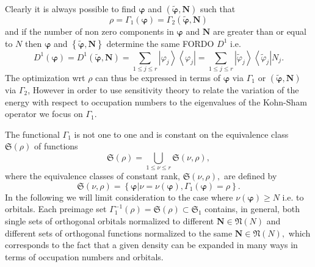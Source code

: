 \documentclass[aps,preprint]{revtex4}%
\begin{document}
\begin{itemize}
Clearly it is always possible to find $\boldsymbol{\varphi}$ and $\left(
\boldsymbol{\tilde{\varphi},N}\right)  $ such that
\begin{equation}
\rho=\Gamma_{1}\left(  \boldsymbol{\varphi}\right)  =\Gamma_{2}\left(
\boldsymbol{\tilde{\varphi},N}\right)
\end{equation}
and if the number of non zero components in $\boldsymbol{\varphi}$ and
$\boldsymbol{N}$ are greater than or equal to $N$ then $\boldsymbol{\varphi}$
and $\left\{  \boldsymbol{\tilde{\varphi},N}\right\}  $ determine the same
FORDO $D^{1}$ i.e.
\begin{equation}
D^{1}\left(  \boldsymbol{\varphi}\right)  =D^{1}\left(  \boldsymbol{\tilde
{\varphi},N}\right)  =\sum_{1\leq j\leq r}\left\vert \varphi_{j}\right\rangle
\left\langle \varphi_{j}\right\vert =\sum_{1\leq j\leq r}\left\vert
\tilde{\varphi}_{j}\right\rangle \left\langle \tilde{\varphi}_{j}\right\vert
N_{j}.
\end{equation}
The optimization wrt $\rho$ can thus be expressed in terms of
$\boldsymbol{\varphi}$ via $\Gamma_{1}$ or $\left(  \boldsymbol{\tilde
{\varphi},N}\right)  $ via $\Gamma_{2}$, However in order to use sensitivity
theory to relate the variation of the energy with respect to occupation
numbers to the eigenvalues of the Kohn-Sham operator we focus on $\Gamma_{1}.$
\end{itemize}

The functional $\Gamma_{1}$ is not one to one and is constant on the
equivalence class $\mathfrak{S}\left(  \rho\right)  $ of functions%
\begin{equation}
\mathfrak{S}\left(  \rho\right)  =\bigcup\limits_{1\leq\nu\leq r}%
\mathfrak{S}\left(  \nu,\rho\right)  ,
\end{equation}
where the equivalence classes of constant rank, $\mathfrak{S}\left(  \nu
,\rho\right)  ,$ are defined by
\begin{equation}
\mathfrak{S}\left(  \nu,\rho\right)  =\left\{  \left.  \boldsymbol{\varphi
}\right\vert \nu=\nu\left(  \boldsymbol{\varphi}\right)  ,\Gamma_{1}\left(
\boldsymbol{\varphi}\right)  =\rho\right\}  .
\end{equation}
In the following we will limit consideration to the case where $\nu\left(
\boldsymbol{\varphi}\right)  \geq N$ i.e. to orbitals. Each preimage set
$\Gamma_{1}^{-1}\left(  \rho\right)  =\mathfrak{S}\left(  \rho\right)
\subset\mathfrak{S}_{1}$ contains, in general, both single sets of orthogonal
orbitals normalized to different $\boldsymbol{N}\in\mathfrak{N}\left(
N\right)  $ and different sets of orthogonal functions normalized to the same
$\boldsymbol{N}\in\mathfrak{N}\left(  N\right)  ,$ which corresponds to the
fact that a given density can be expanded in many ways in terms of occupation
numbers and orbitals.
\end{document}
